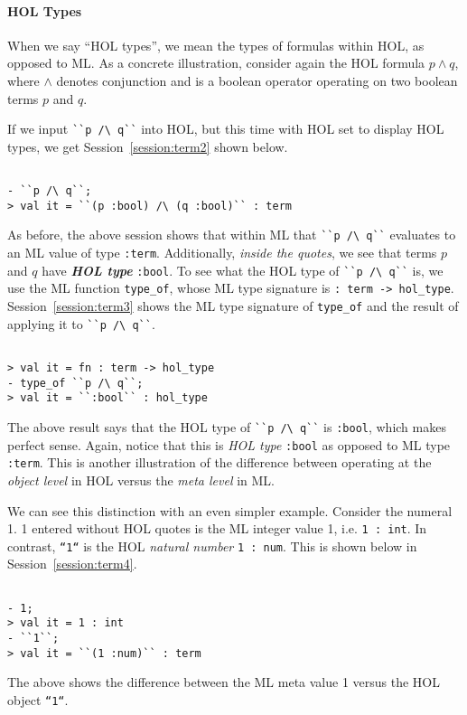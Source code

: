 \paragraph*{HOL Types}

When we say ``HOL types'', we mean the types of formulas within HOL,
as opposed to ML. As a concrete illustration, consider again the HOL
formula $p \wedge q$, where $\wedge$ denotes conjunction and is a
boolean operator operating on two boolean terms $p$ and $q$.

If we input \small{\verb|``p /\ q``|} into HOL, but this
time with HOL set to display HOL types, we get
Session~\ref{session:term2} shown below.
\begin{session}
  \label{session:term2}
\begin{verbatim}

- ``p /\ q``;
> val it = ``(p :bool) /\ (q :bool)`` : term
\end{verbatim}
\end{session}
As before, the above session shows that within ML that
\small{\verb|``p /\ q``|} evaluates to an ML value of type
\texttt{:term}.  Additionally, \emph{inside the quotes}, we see that
terms $p$ and $q$ have \emph{\textbf{HOL type}} \texttt{:bool}. To see
what the HOL type of \small{\verb|``p /\ q``|} is, we use
the ML function \texttt{type\_of}, whose ML type signature is
\texttt{: term -> hol\_type}. Session~\ref{session:term3} shows the ML
type signature of \texttt{type\_of} and the result of applying it to
\small{\verb|``p /\ q``|}.
\begin{session}
  \label{session:term3}
\begin{verbatim}

> val it = fn : term -> hol_type
- type_of ``p /\ q``;
> val it = ``:bool`` : hol_type
\end{verbatim}
\end{session}
The above result says that the HOL type of
\small{\verb|``p /\ q``|} is \texttt{:bool}, which makes
perfect sense.  Again, notice that this is \emph{HOL type}
\texttt{:bool} as opposed to ML type \texttt{:term}. This is another
illustration of the difference between operating at the \emph{object
  level} in HOL versus the \emph{meta level} in ML.

We can see this distinction with an even simpler example. Consider the
numeral 1. 1 entered without HOL quotes is the ML integer value 1,
i.e. \texttt{1 : int}.  In contrast, \texttt{``1``}
is the HOL \emph{natural number} \texttt{1 : num}.  This is shown
below in Session~\ref{session:term4}.
\begin{session}
  \label{session:term4}
\begin{verbatim}

- 1;
> val it = 1 : int
- ``1``;
> val it = ``(1 :num)`` : term
\end{verbatim}
\end{session}
The above shows the difference between the ML meta value 1 versus the
HOL object \texttt{``1``}.

